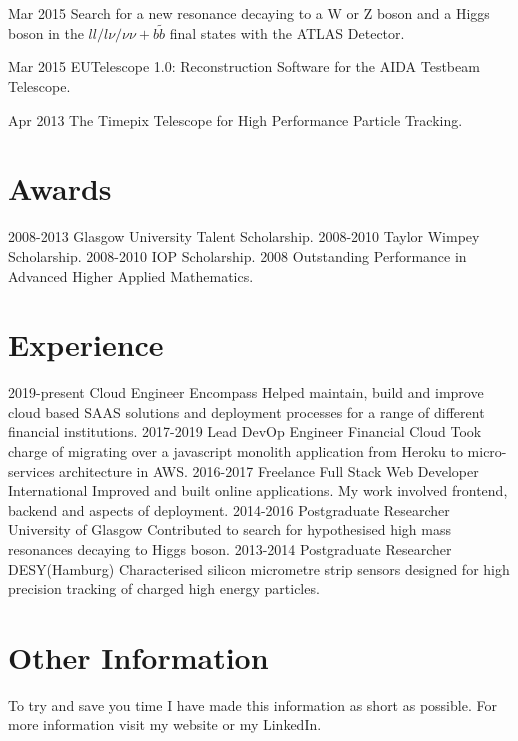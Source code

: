 \documentclass[]{twentysecondcv}
\begin{document}
\begin{twentyshort}
  \twentyitemshort
    {Mar 2015}
    {Search for a new resonance decaying to a W or Z boson and a Higgs boson in the $ll/l\nu/\nu\nu+b\tilde{b}$ final states with the ATLAS Detector.}
\end{twentyshort}

\begin{twentyshort}
  \twentyitemshort
    {Mar 2015}
    {EUTelescope 1.0: Reconstruction Software for the AIDA Testbeam Telescope.}
\end{twentyshort}

\begin{twentyshort}
  \twentyitemshort
    {Apr 2013}
    {The Timepix Telescope for High Performance Particle Tracking.}
\end{twentyshort}




\section*{Awards}

\begin{twentyshort}
  \twentyitemshort
    {2008-2013}
    {Glasgow University Talent Scholarship.}
  \twentyitemshort
    {2008-2010}
    {Taylor Wimpey Scholarship.}
  \twentyitemshort
    {2008-2010}
    {IOP Scholarship.}
  \twentyitemshort
    {2008}
    {Outstanding Performance in Advanced Higher Applied Mathematics.}
\end{twentyshort}


\section*{Experience}

\begin{twenty}
  \twentyitem
  {2019-present}
  {Cloud Engineer}
  {Encompass}
  {Helped maintain, build and improve cloud based SAAS solutions and deployment processes for a range of different financial institutions.}
  \twentyitem
  {2017-2019}
  {Lead DevOp Engineer}
  {Financial Cloud}
  {Took charge of migrating over a javascript monolith application from Heroku to micro-services architecture in AWS.}
  \twentyitem
    {2016-2017}
    {Freelance Full Stack Web Developer}
    {International}
    {Improved and built online applications. My work involved frontend, backend and aspects of deployment.}
  \twentyitem
    {2014-2016}
    {Postgraduate Researcher}
    {University of Glasgow}
    {Contributed to search for hypothesised high mass resonances decaying to Higgs boson.}
\twentyitem
    {2013-2014}
    {Postgraduate Researcher}
		{DESY(Hamburg)}
    {Characterised silicon micrometre strip sensors designed for high precision tracking of charged high energy particles.}

\end{twenty}
\section*{Other Information}
\hspace*{5pt}
To try and save you time I have made this information as short as possible. For more information visit my website or my LinkedIn.
\hspace*{5pt}
\vspace*{2pt}

\end{document}
